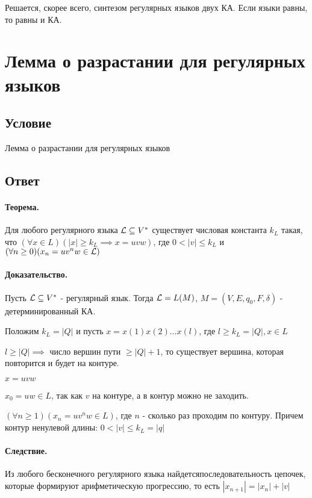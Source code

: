 \documentclass{report}
\begin{document}
Решается, скорее всего, синтезом регулярных языков двух КА. Если языки равны, то равны и КА.

\newpage

\section{Лемма о разрастании для регулярных языков}
\subsection{Условие}
Лемма о разрастании для регулярных языков

\subsection{Ответ}
\paragraph*{Теорема.}
Для любого регулярного языка $ {\cal L} \subseteq V^{*}$ существует числовая константа
$k_{L}$ такая, что $(\forall x \in L)( \mid x\mid \ge k_{L} \implies x = uvw)$, где
$0 <  \mid v \mid \le k_{L}$ и $(\forall n \ge 0)(x_{n}=uv^{n}w \in {\cal L})$ 

\paragraph*{Доказательство.}
Пусть $ {\cal L} \subseteq V^{*}$ - регулярный язык. Тогда $ {\cal L} = L(M)$,
$M = (V, E, q_0,F,\delta)$ - детерминированный КА.

 Положим $k_{L} = |Q|$ и пусть $x = x(1)x(2)\ldots x(l)$, где $l \ge k_{L} = |Q|, x \in L$

$l \ge |Q| \implies$ число вершин пути $\ge |Q| + 1$, то существует вершина, которая
повторится и будет на контуре.

$x = uvw$

 $x_0=uw \in L$, так как $v$ на контуре, а в контур можно не заходить.

$(\forall n \ge 1)(x_{n}=uv^{n}w \in L)$, где $n$ - сколько раз проходим по контуру.
Причем контур ненулевой длины:  $0 < |v| \le  k_{L} = |q|$

\paragraph*{Следствие.}
Из любого бесконечного регулярного языка найдется\newline последовательность цепочек, которые формируют
арифметическую прогрессию, то есть $|x_{n+1}| = |x_{n}| + |v|$ 
\end{document}
